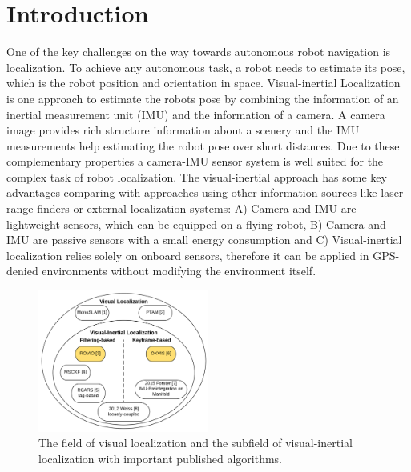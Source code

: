 \chapter{Introduction}
\label{sec:introduction}

One of the key challenges on the way towards autonomous robot navigation is localization. To achieve any autonomous task, a robot needs to estimate its pose, which is the robot position and orientation in space. Visual-inertial Localization is one approach to estimate the robots pose by combining the information of an inertial measurement unit (IMU) and the information of a camera. A camera image provides rich structure information about a scenery and the IMU measurements help estimating the robot pose over short distances. Due to these complementary properties a camera-IMU sensor system is well suited for the complex task of robot localization. The visual-inertial approach has some key advantages comparing with approaches using other information sources like laser range finders or external localization systems: A) Camera and IMU are lightweight sensors, which can be equipped on a flying robot, B) Camera and IMU are passive sensors with a small energy consumption and C) Visual-inertial localization relies solely on onboard sensors, therefore it can be applied in GPS-denied environments without modifying the environment itself. \\


\begin{figure}[h]
   \centering
   \includegraphics[width=0.5\textwidth]{images/state_of_the_art.png}
   \caption{The field of visual localization and the subfield of visual-inertial localization with important published algorithms.}
   \label{pics:state_of_the_art}
\end{figure}

